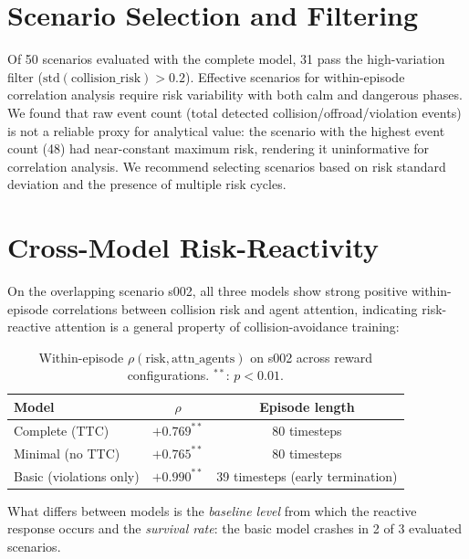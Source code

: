 \documentclass[10pt]{article} %
\begin{document}
\section{Scenario Selection and Filtering}
\label{sec:app_scenarios}

Of 50 scenarios evaluated with the complete model, 31 pass the high-variation filter ($\mathrm{std}(\mathrm{collision\_risk}) > 0.2$). Effective scenarios for within-episode correlation analysis require risk variability with both calm and dangerous phases. We found that raw event count (total detected collision/offroad/violation events) is not a reliable proxy for analytical value: the scenario with the highest event count (48) had near-constant maximum risk, rendering it uninformative for correlation analysis. We recommend selecting scenarios based on risk standard deviation and the presence of multiple risk cycles.

\section{Cross-Model Risk-Reactivity}
\label{sec:app_crossmodel}

On the overlapping scenario s002, all three models show strong positive within-episode correlations between collision risk and agent attention, indicating risk-reactive attention is a general property of collision-avoidance training:

\begin{table}[ht]
    \caption{Within-episode $\rho(\mathrm{risk}, \mathrm{attn\_agents})$ on s002 across reward configurations. $^{**}$: $p < 0.01$.}
    \begin{center}
    \begin{tabular}{lcc}
        \toprule
        \textbf{Model} & $\rho$ & \textbf{Episode length} \\
        \midrule
        Complete (TTC) & $+0.769^{**}$ & 80 timesteps \\
        Minimal (no TTC) & $+0.765^{**}$ & 80 timesteps \\
        Basic (violations only) & $+0.990^{**}$ & 39 timesteps (early termination) \\
        \bottomrule
    \end{tabular}
    \end{center}
\end{table}

What differs between models is the \textit{baseline level} from which the reactive response occurs and the \textit{survival rate}: the basic model crashes in 2 of 3 evaluated scenarios.
\end{document}
